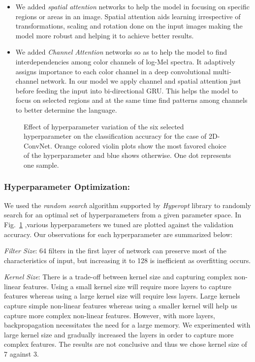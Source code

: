 \documentclass[runningheads]{llncs}
\begin{document}
\begin{itemize}
 \item We added \emph{spatial attention} \cite{chen2017sca} networks to help the model in focusing on specific regions or areas in an image. Spatial attention aids learning irrespective of transformations, scaling and rotation done on the input images making the model more robust and helping it to achieve better results.
 
 \item We added \emph{Channel Attention} networks so as to help the model to find interdependencies among color channels of log-Mel spectra. It adaptively assigns importance to each color channel in a deep convolutional multi-channel network. In our model we apply channel and spatial attention just before feeding the input into bi-directional GRU. This helps the model to focus on selected regions and at the same time find patterns among channels to better determine the language.
\end{itemize}
 
\begin{figure}
 \centering
 \setlength{\belowcaptionskip}{-33pt}
 \caption {Effect of hyperparameter variation of the six selected hyperparameter on the  classification accuracy for the case of 2D-ConvNet. Orange colored violin plots show the most favored choice of the hyperparameter and blue shows otherwise. One dot represents one sample.}
 \label{fig:2dcnn}
\end{figure}

 \subsubsection{Hyperparameter Optimization:} We used the \emph{random search} algorithm supported by \emph{Hyperopt} \cite{bergstra2013making} library to randomly search for an optimal set of hyperparameters from a given parameter space. In Fig.~\ref{fig:2dcnn} ,various hyperparameters we tuned are plotted against the validation accuracy. Our observations for each hyperparameter are summarized below:

 \emph{Filter Size}: 64 filters in the first layer of network can preserve most of the characteristics of input, but increasing it to 128 is inefficient as overfitting occurs.

 \emph{Kernel Size}: There is a trade-off between kernel size and capturing complex non-linear features. Using a small kernel size will require more layers to capture features whereas using a large kernel size will require less layers. Large kernels capture simple non-linear features whereas using a smaller kernel will help us capture more complex non-linear features. However, with more layers, backpropagation necessitates the need for a large memory. We experimented with large kernel size and gradually increased the layers in order to capture more complex features. The results are not conclusive and thus we chose kernel size of 7 against 3.
\end{document}
